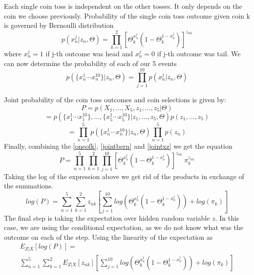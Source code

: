 \documentclass[11pt]{article}
\begin{document}
Each single coin toss is independent on the other tosses. It only depends on the coin we choose previously. Probability of the single coin toss outcome given coin k is governed by Bernoulli distribution
\begin{equation}
p(x_n^j|{z_n},\Theta)=\prod_{k=1}^{2}[\Theta_k^{x_n^j}(1-\Theta_k^{1-x_n^j})]^{z_{nk}}
\end{equation}
where $x_n^j=1$ if j-th outcome was head and $x_n^j=0$ if j-th outcome was tail. We can now determine the probability of each of our 5 events
\begin{equation}\label{jointbern}
p(\{x^1_n\cdots x^{10}_n\}|z_n,\Theta)=\prod_{j=1}^{10}p(x_n^j|{z_n},\Theta)
\end{equation}

Joint probability of the coin toss outcomes and coin selections is given by:
\begin{equation}
P = p(X_1,\dots, X_5,{z_1,\dots,z_5}|\Theta) 
\end{equation}
\begin{equation}
= p(\{x^1_1\cdots x^{10}_1\},\dots,\{x^1_5\cdots x^{10}_5\}| z_1,\dots,z_5,\Theta)p(z_1,\dots,z_5)
\end{equation}
\begin{equation}\label{jointxz}
=\prod_{n=1}^{5}p(\{x^1_n\cdots x^{10}_n\}|z_n,\Theta) \prod_{n=1}^{5}p({z_n})
\end{equation}
Finally, combining the \eqref{oneofk}, \eqref{jointbern} and \eqref{jointxz} we get the equation
\begin{equation}
P = 
\prod_{n=1}^{5}\prod_{k=1}^{2}\prod_{j=1}^{10}[\Theta_k^{x_n^j}(1-\Theta_k^{1-x_n^j})]^{z_{nk}}\:\pi_{k}^{z_{nk}}
\end{equation}
Taking the log of the expression above we get rid of the products in exchange of the summations.
\begin{equation}
log(P) = 
\sum_{n=1}^{5}\sum_{k=1}^{2}z_{nk}[\sum_{j=1}^{10}log(\Theta_k^{x_n^j}(1-\Theta_k^{1-x_n^j}))+log(\pi_{k})]
\end{equation}
The final step is taking the expectation over hidden random variable $z$. In this case, we are using the conditional expectation, as we do not
know what was the outcome on each of the step. Using the linearity of the expectation as
\begin{equation}
\begin{gathered}
E_{Z|X}[log(P)] =  \\
\sum_{n=1}^{5}\sum_{k=1}^{2}E_{Z|X}[z_{nk}][\sum_{j=1}^{10}log(\Theta_k^{x_n^j}(1-\Theta_k^{1-x_n^j}))+log(\pi_{k})]
\end{gathered}
\end{equation}
\end{document}

